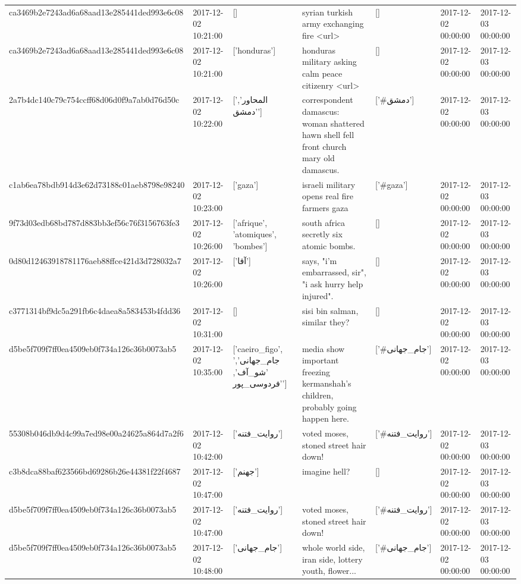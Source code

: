 \begin{tabular}{lllllll}
ca3469b2e7243ad6a68aad13e285441ded993e6c08 & 2017-12-02 10:21:00 & [] & syrian turkish army exchanging fire <url> & [] & 2017-12-02 00:00:00 & 2017-12-03 00:00:00 \\
ca3469b2e7243ad6a68aad13e285441ded993e6c08 & 2017-12-02 10:21:00 & ['honduras'] & honduras military asking calm peace citizenry <url> & [] & 2017-12-02 00:00:00 & 2017-12-03 00:00:00 \\
2a7b4dc140c79c754ccff68d06d0f9a7ab0d76d50c & 2017-12-02 10:22:00 & ['المحاور', 'دمشق'] & correspondent damascus: woman shattered hawn shell fell front church mary old damascus. & ['#دمشق'] & 2017-12-02 00:00:00 & 2017-12-03 00:00:00 \\
c1ab6ea78bdb914d3e62d73188c01aeb8798e98240 & 2017-12-02 10:23:00 & ['gaza'] & israeli military opens real fire farmers gaza & ['#gaza'] & 2017-12-02 00:00:00 & 2017-12-03 00:00:00 \\
9f73d03edb68bd787d883bb3ef56c76f3156763fe3 & 2017-12-02 10:26:00 & ['afrique', 'atomiques', 'bombes'] & south africa secretly six atomic bombs. & [] & 2017-12-02 00:00:00 & 2017-12-03 00:00:00 \\
0d80d12463918781176aeb88ffce421d3d728032a7 & 2017-12-02 10:26:00 & ['آقا'] & says, "i'm embarrassed, sir", "i ask hurry help injured". & [] & 2017-12-02 00:00:00 & 2017-12-03 00:00:00 \\
c3771314bf9dc5a291fb6c4daea8a583453b4fdd36 & 2017-12-02 10:31:00 & [] & sisi bin salman, similar they? & [] & 2017-12-02 00:00:00 & 2017-12-03 00:00:00 \\
d5be5f709f7ff0ea4509eb0f734a126c36b0073ab5 & 2017-12-02 10:35:00 & ['caeiro_figo', 'جام_جهانی', 'شو_آف', 'فردوسی_پور'] & media show important freezing kermanshah's children, probably going happen here. & ['#جام_جهانی'] & 2017-12-02 00:00:00 & 2017-12-03 00:00:00 \\
55308b046db9d4c99a7ed98e00a24625a864d7a2f6 & 2017-12-02 10:42:00 & ['روایت_فتنه'] & voted moses, stoned street hair down! & ['#روایت_فتنه'] & 2017-12-02 00:00:00 & 2017-12-03 00:00:00 \\
c3b8dca88baf623566bd69286b26e44381f22f4687 & 2017-12-02 10:47:00 & ['جهنم'] & imagine hell? & [] & 2017-12-02 00:00:00 & 2017-12-03 00:00:00 \\
d5be5f709f7ff0ea4509eb0f734a126c36b0073ab5 & 2017-12-02 10:47:00 & ['روایت_فتنه'] & voted moses, stoned street hair down! & ['#روایت_فتنه'] & 2017-12-02 00:00:00 & 2017-12-03 00:00:00 \\
d5be5f709f7ff0ea4509eb0f734a126c36b0073ab5 & 2017-12-02 10:48:00 & ['جام_جهانی'] & whole world side, iran side, lottery youth, flower... & ['#جام_جهانی'] & 2017-12-02 00:00:00 & 2017-12-03 00:00:00 \\

\end{tabular}
